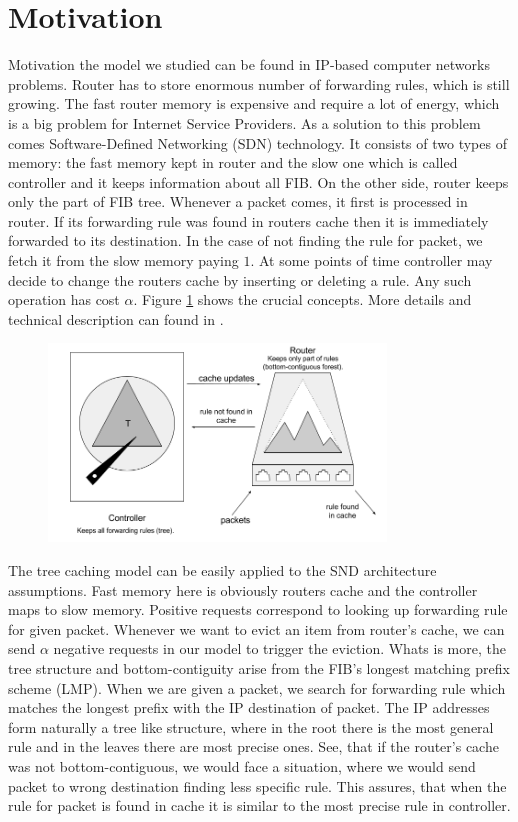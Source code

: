 \section{Motivation}
Motivation the model we studied can be found in IP-based computer networks 
problems. Router has to store enormous number of forwarding rules, which is 
still growing. The fast router memory is expensive and require a lot of energy, 
which is a big problem for Internet Service Providers. As a solution to this 
problem comes Software-Defined Networking (SDN) technology. It consists of two 
types of memory: the fast memory kept in router and the slow one which is 
called controller and it keeps information about all FIB. On the other side, 
router keeps only the part of FIB tree. Whenever a packet comes, it first is 
processed in router. If its forwarding rule was found in routers cache then it 
is immediately forwarded to its destination. In the case of not finding the 
rule for packet, we fetch it from the slow memory paying $1$. At some points of 
time controller may decide to change the routers cache by inserting or deleting 
a rule. Any such operation has cost $\alpha$. Figure \ref{fig:motivation} shows 
the crucial concepts. More details and technical description can found in 
\cite{sdn}.
 \begin{figure}
 \begin{center}
  \includegraphics[width=0.8\textwidth]{motivation.png}
\end{center}
\caption{}
\label{fig:motivation}
\end{figure}

The tree caching model can be easily applied to the SND architecture 
assumptions. Fast memory here is obviously routers cache and the 
controller maps to slow memory. Positive requests correspond to looking up
forwarding rule for given packet. Whenever we want to evict an item from 
router's cache, we can send $\alpha$ negative requests in our model to trigger 
the eviction. Whats is more, the tree structure and bottom-contiguity arise 
from the FIB's longest matching prefix scheme (LMP). When we are given a 
packet, we search for forwarding rule which matches the longest prefix with the 
IP destination of packet. The IP addresses form naturally a tree like 
structure, where in the root there is the most general rule and in the leaves 
there are most precise ones. See, that if the router's cache was not 
bottom-contiguous, we would face a situation, where we would send packet to 
wrong destination finding less specific rule. This assures, that when the rule 
for packet is found in cache it is similar to the most precise rule in 
controller.
